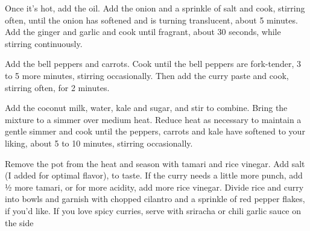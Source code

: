 {{            Once it’s hot, add the oil.
            Add the onion and a sprinkle of salt and cook, stirring often, until the onion has softened and is turning translucent, about 5 minutes.
            Add the ginger and garlic and cook until fragrant, about 30 seconds, while stirring continuously.
        \item Add the bell peppers and carrots.
            Cook until the bell peppers are fork-tender, 3 to 5 more minutes, stirring occasionally.
            Then add the curry paste and cook, stirring often, for 2 minutes.
        \item Add the coconut milk, water, kale and sugar, and stir to combine.
            Bring the mixture to a simmer over medium heat.
            Reduce heat as necessary to maintain a gentle simmer and cook until the peppers, carrots and kale have softened to your liking, about 5 to 10 minutes, stirring occasionally.
        \item Remove the pot from the heat and season with tamari and rice vinegar.
            Add salt (I added \fourth \teaspoon for optimal flavor), to taste.
            If the curry needs a little more punch, add ½ \teaspoon more tamari, or for more acidity, add \half \teaspoon more rice vinegar.
            Divide rice and curry into bowls and garnish with chopped cilantro and a sprinkle of red pepper flakes, if you'd like.
            If you love spicy curries, serve with sriracha or chili garlic sauce on the side
    }
}

